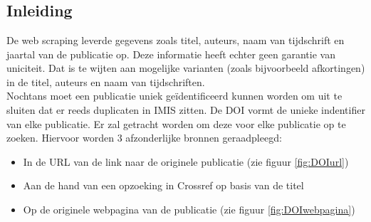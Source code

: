 
\chapter{}%
\label{ch:linked_data}

\section{Inleiding}
De web scraping leverde gegevens zoals titel, auteurs, naam van tijdschrift en jaartal van de publicatie op. Deze informatie heeft echter geen garantie van uniciteit. Dat is te wijten aan mogelijke varianten (zoals bijvoorbeeld afkortingen) in de titel, auteurs en naam van tijdschriften.\\
Nochtans moet een publicatie uniek geïdentificeerd kunnen worden om uit te sluiten dat er reeds duplicaten in IMIS zitten.
De DOI vormt de unieke indentifier van elke publicatie. Er zal getracht worden om deze voor elke publicatie op te zoeken. Hiervoor worden 3 afzonderlijke bronnen geraadpleegd:
\begin{itemize}
    \item In de URL van de link naar de originele publicatie (zie figuur \ref{fig:DOIurl})
    \item Aan de hand van een opzoeking in Crossref op basis van de titel
    \item Op de originele webpagina van de publicatie (zie figuur \ref{fig:DOIwebpagina})
\end{itemize}

